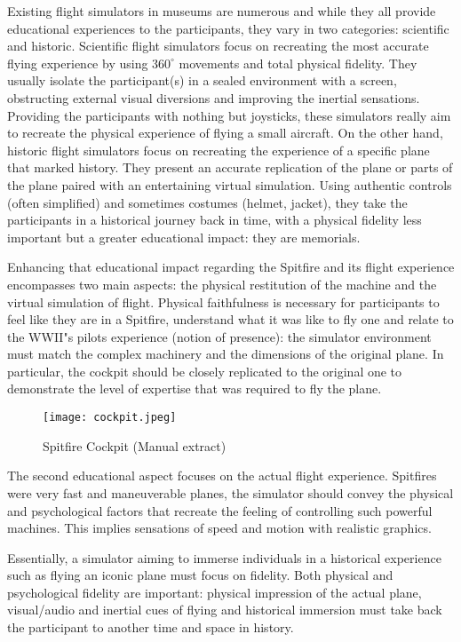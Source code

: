 \documentclass[authoryear,preprint]{sigplanconf}
\begin{document}
Existing flight simulators in museums are numerous and while they all provide educational experiences to the participants, they vary in two categories: scientific and historic. Scientific flight simulators \cite{Exist1} focus on recreating the most accurate flying experience by using $360^{\circ}$ movements and total physical fidelity. They usually isolate the participant(s) in a sealed environment with a screen, obstructing external visual diversions and improving the inertial sensations. Providing the participants with nothing but joysticks, these simulators really aim to recreate the physical experience of flying a small aircraft. On the other hand, historic flight simulators \cite{Exist2} focus on recreating the experience of a specific plane that marked history. They present an accurate replication of the plane or parts of the plane paired with an entertaining virtual simulation. Using authentic controls (often simplified) and sometimes costumes (helmet, jacket), they take the participants in a historical journey back in time, with a physical fidelity less important but a greater educational impact: they are memorials.

Enhancing that educational impact regarding the Spitfire and its flight experience encompasses two main aspects: the physical restitution of the machine and the virtual simulation of flight. Physical faithfulness is necessary for participants to feel like they are in a Spitfire, understand what it was like to fly one and relate to the WWII"s pilots experience (notion of presence): the simulator environment must match the complex machinery and the dimensions of the original plane. In particular, the cockpit should be closely replicated to the original one to demonstrate the level of expertise that was required to fly the plane.

\begin{figure}[!h]
\centering
\texttt{[image: cockpit.jpeg]}
\caption{Spitfire Cockpit (Manual extract)}
\label{simconcept}
\end{figure}

The second educational aspect focuses on the actual flight experience. Spitfires were very fast and maneuverable planes, the simulator should convey the physical and psychological factors that recreate the feeling of controlling such powerful machines. This implies sensations of speed and motion with realistic graphics.

Essentially, a simulator aiming to immerse individuals in a historical experience such as flying an iconic plane must focus on fidelity. Both physical and psychological fidelity are important: physical impression of the actual plane, visual/audio and inertial cues of flying and historical immersion must take back the participant to another time and space in history.
\end{document}
